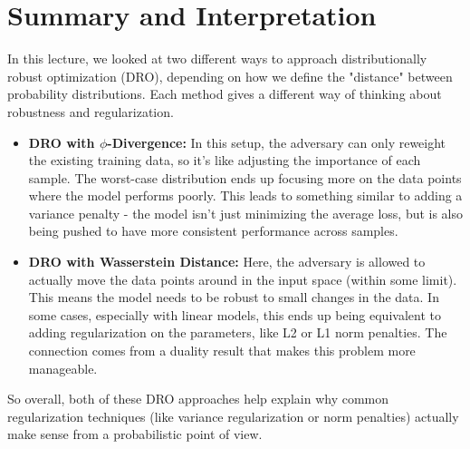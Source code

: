 \documentclass[12pt]{report}
\begin{document}


\section{Summary and Interpretation}

In this lecture, we looked at two different ways to approach distributionally robust optimization (DRO), depending on how we define the "distance" between probability distributions. Each method gives a different way of thinking about robustness and regularization.

\begin{itemize}
    \item \textbf{DRO with $\phi$-Divergence:} In this setup, the adversary can only reweight the existing training data, so it's like adjusting the importance of each sample. The worst-case distribution ends up focusing more on the data points where the model performs poorly. This leads to something similar to adding a variance penalty - the model isn't just minimizing the average loss, but is also being pushed to have more consistent performance across samples.
    \item \textbf{DRO with Wasserstein Distance:} Here, the adversary is allowed to actually move the data points around in the input space (within some limit). This means the model needs to be robust to small changes in the data. In some cases, especially with linear models, this ends up being equivalent to adding regularization on the parameters, like L2 or L1 norm penalties. The connection comes from a duality result that makes this problem more manageable.
\end{itemize}
So overall, both of these DRO approaches help explain why common regularization techniques (like variance regularization or norm penalties) actually make sense from a probabilistic point of view.


\end{document}
